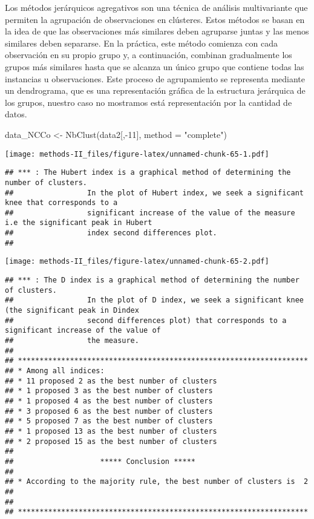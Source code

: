 \documentclass[
]{article}
\newenvironment{Shaded}{\begin{snugshade}}{\end{snugshade}}
\newcommand{\AttributeTok}[1]{\textcolor[rgb]{0.77,0.63,0.00}{#1}}
\newcommand{\DecValTok}[1]{\textcolor[rgb]{0.00,0.00,0.81}{#1}}
\newcommand{\FunctionTok}[1]{\textcolor[rgb]{0.00,0.00,0.00}{#1}}
\newcommand{\NormalTok}[1]{#1}
\newcommand{\OtherTok}[1]{\textcolor[rgb]{0.56,0.35,0.01}{#1}}
\newcommand{\SpecialCharTok}[1]{\textcolor[rgb]{0.00,0.00,0.00}{#1}}
\newcommand{\StringTok}[1]{\textcolor[rgb]{0.31,0.60,0.02}{#1}}
\begin{document}
Los métodos jerárquicos agregativos son una técnica de análisis
multivariante que permiten la agrupación de observaciones en clústeres.
Estos métodos se basan en la idea de que las observaciones más similares
deben agruparse juntas y las menos similares deben separarse. En la
práctica, este método comienza con cada observación en su propio grupo
y, a continuación, combinan gradualmente los grupos más similares hasta
que se alcanza un único grupo que contiene todas las instancias u
observaciones. Este proceso de agrupamiento se representa mediante un
dendrograma, que es una representación gráfica de la estructura
jerárquica de los grupos, nuestro caso no mostramos está representación
por la cantidad de datos.~

\begin{Shaded}
\begin{Highlighting}[]
\NormalTok{data\_NCCo }\OtherTok{\textless{}{-}} \FunctionTok{NbClust}\NormalTok{(data2[,}\SpecialCharTok{{-}}\DecValTok{11}\NormalTok{], }\AttributeTok{method =} \StringTok{"complete"}\NormalTok{)}
\end{Highlighting}
\end{Shaded}

\texttt{[image: methods-II\_files/figure-latex/unnamed-chunk-65-1.pdf]}

\begin{verbatim}
## *** : The Hubert index is a graphical method of determining the number of clusters.
##                 In the plot of Hubert index, we seek a significant knee that corresponds to a 
##                 significant increase of the value of the measure i.e the significant peak in Hubert
##                 index second differences plot. 
## 
\end{verbatim}

\texttt{[image: methods-II\_files/figure-latex/unnamed-chunk-65-2.pdf]}

\begin{verbatim}
## *** : The D index is a graphical method of determining the number of clusters. 
##                 In the plot of D index, we seek a significant knee (the significant peak in Dindex
##                 second differences plot) that corresponds to a significant increase of the value of
##                 the measure. 
##  
## ******************************************************************* 
## * Among all indices:                                                
## * 11 proposed 2 as the best number of clusters 
## * 1 proposed 3 as the best number of clusters 
## * 1 proposed 4 as the best number of clusters 
## * 3 proposed 6 as the best number of clusters 
## * 5 proposed 7 as the best number of clusters 
## * 1 proposed 13 as the best number of clusters 
## * 2 proposed 15 as the best number of clusters 
## 
##                    ***** Conclusion *****                            
##  
## * According to the majority rule, the best number of clusters is  2 
##  
##  
## *******************************************************************
\end{verbatim}
\end{document}
